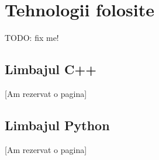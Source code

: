 \chapter{Tehnologii folosite}

TODO: fix me!
\section{Limbajul C++}
[Am rezervat o pagina]
\pagebreak




\section{Limbajul Python}
[Am rezervat o pagina]
\pagebreak








